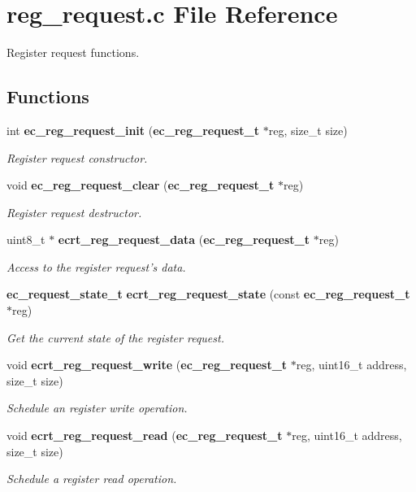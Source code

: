 \section{reg\-\_\-request.\-c \-File \-Reference}
\label{reg__request_8c}


\-Register request functions.  


\subsection*{\-Functions}
\begin{DoxyCompactItemize}
\item 
int {\bf ec\-\_\-reg\-\_\-request\-\_\-init} ({\bf ec\-\_\-reg\-\_\-request\-\_\-t} $\ast$reg, size\-\_\-t size)
\begin{DoxyCompactList}\small\item\em \-Register request constructor. \end{DoxyCompactList}\item 
void {\bf ec\-\_\-reg\-\_\-request\-\_\-clear} ({\bf ec\-\_\-reg\-\_\-request\-\_\-t} $\ast$reg)
\begin{DoxyCompactList}\small\item\em \-Register request destructor. \end{DoxyCompactList}\item 
uint8\-\_\-t $\ast$ {\bf ecrt\-\_\-reg\-\_\-request\-\_\-data} ({\bf ec\-\_\-reg\-\_\-request\-\_\-t} $\ast$reg)
\begin{DoxyCompactList}\small\item\em \-Access to the register request's data. \end{DoxyCompactList}\item 
{\bf ec\-\_\-request\-\_\-state\-\_\-t} {\bf ecrt\-\_\-reg\-\_\-request\-\_\-state} (const {\bf ec\-\_\-reg\-\_\-request\-\_\-t} $\ast$reg)
\begin{DoxyCompactList}\small\item\em \-Get the current state of the register request. \end{DoxyCompactList}\item 
void {\bf ecrt\-\_\-reg\-\_\-request\-\_\-write} ({\bf ec\-\_\-reg\-\_\-request\-\_\-t} $\ast$reg, uint16\-\_\-t address, size\-\_\-t size)
\begin{DoxyCompactList}\small\item\em \-Schedule an register write operation. \end{DoxyCompactList}\item 
void {\bf ecrt\-\_\-reg\-\_\-request\-\_\-read} ({\bf ec\-\_\-reg\-\_\-request\-\_\-t} $\ast$reg, uint16\-\_\-t address, size\-\_\-t size)
\begin{DoxyCompactList}\small\item\em \-Schedule a register read operation. \end{DoxyCompactList}\end{DoxyCompactItemize}


